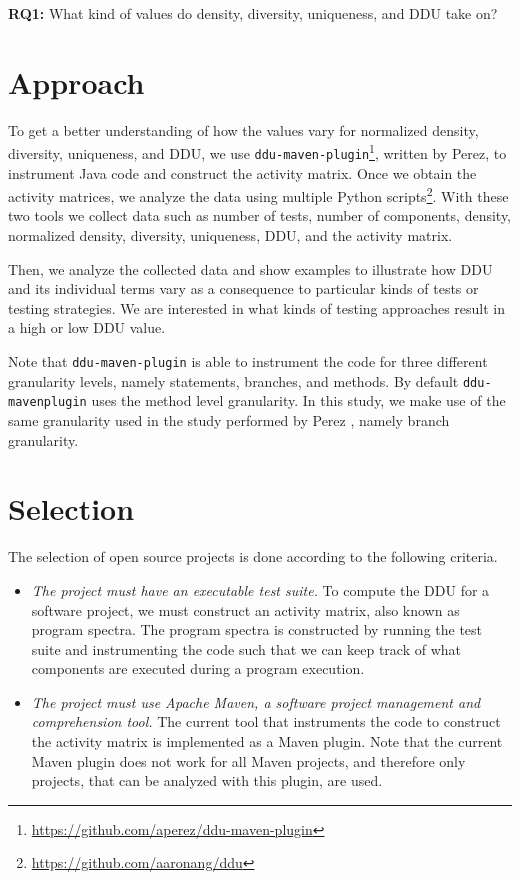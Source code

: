 \documentclass[twoside,a4paper,11pt]{memoir}
\begin{document}
\begin{framed}
\noindent
\textbf{RQ1:} What kind of values do density, diversity, uniqueness, and DDU take on?
\end{framed}

\section{Approach}
To get a better understanding of how the values vary for normalized density, diversity, uniqueness, and DDU, we use \texttt{ddu-maven-plugin}\footnote{\url{https://github.com/aperez/ddu-maven-plugin}}, written by Perez, to instrument Java code and construct the activity matrix.
Once we obtain the activity matrices, we analyze the data using multiple Python scripts\footnote{\url{https://github.com/aaronang/ddu}}.
With these two tools we collect data such as number of tests, number of components, density, normalized density, diversity, uniqueness, DDU, and the activity matrix.

Then, we analyze the collected data and show examples to illustrate how DDU and its individual terms vary as a consequence to particular kinds of tests or testing strategies.
We are interested in what kinds of testing approaches result in a high or low DDU value.

Note that \texttt{ddu-maven-plugin} is able to instrument the code for three different granularity levels, namely statements, branches, and methods.
By default \texttt{ddu-maven\-plugin} uses the method level granularity.
In this study, we make use of the same granularity used in the study performed by Perez \etal \cite{DBLP:conf/icse/PerezAD17}, namely branch granularity.

\section{Selection}
The selection of open source projects is done according to the following criteria.
\begin{itemize}
  \item \emph{The project must have an executable test suite.}
  To compute the DDU for a software project, we must construct an activity matrix, also known as program spectra.
  The program spectra is constructed by running the test suite and instrumenting the code such that we can keep track of what components are executed during a program execution.

  \item \emph{The project must use Apache Maven, a software project management and comprehension tool.}
  The current tool that instruments the code to construct the activity matrix is implemented as a Maven plugin.
  Note that the current Maven plugin does not work for all Maven projects, and therefore only projects, that can be analyzed with this plugin, are used.
\end{itemize}
\end{document}
